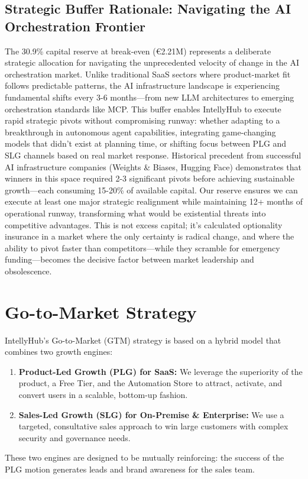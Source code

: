 \subsection{Strategic Buffer Rationale: Navigating the AI Orchestration Frontier}
The 30.9\% capital reserve at break-even (€2.21M) represents a deliberate strategic allocation for navigating the unprecedented velocity of change in the AI orchestration market. Unlike traditional SaaS sectors where product-market fit follows predictable patterns, the AI infrastructure landscape is experiencing fundamental shifts every 3-6 months—from new LLM architectures to emerging orchestration standards like MCP. This buffer enables IntellyHub to execute rapid strategic pivots without compromising runway: whether adapting to a breakthrough in autonomous agent capabilities, integrating game-changing models that didn't exist at planning time, or shifting focus between PLG and SLG channels based on real market response. Historical precedent from successful AI infrastructure companies (Weights \& Biases, Hugging Face) demonstrates that winners in this space required 2-3 significant pivots before achieving sustainable growth—each consuming 15-20\% of available capital. Our reserve ensures we can execute at least one major strategic realignment while maintaining 12+ months of operational runway, transforming what would be existential threats into competitive advantages. This is not excess capital; it's calculated optionality insurance in a market where the only certainty is radical change, and where the ability to pivot faster than competitors—while they scramble for emergency funding—becomes the decisive factor between market leadership and obsolescence.

\newpage
\section{Go-to-Market Strategy}

IntellyHub's Go-to-Market (GTM) strategy is based on a hybrid model that combines two growth engines:
\begin{enumerate}
    \item \textbf{Product-Led Growth (PLG) for SaaS:} We leverage the superiority of the product, a Free Tier, and the Automation Store to attract, activate, and convert users in a scalable, bottom-up fashion.
    \item \textbf{Sales-Led Growth (SLG) for On-Premise \& Enterprise:} We use a targeted, consultative sales approach to win large customers with complex security and governance needs.
\end{enumerate}
These two engines are designed to be mutually reinforcing: the success of the PLG motion generates leads and brand awareness for the sales team.
